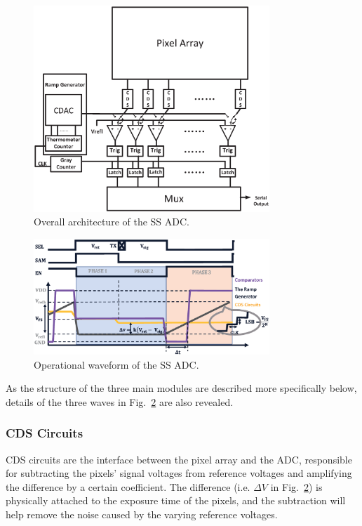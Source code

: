 \begin{figure}[htbp]
	\centerline{\includegraphics[width=3.5in]{./Figures/SSADC.eps}}
	\caption{Overall architecture of the SS ADC.}
	\label{SSADC}
\end{figure} 

\begin{figure}[htbp]
	\centerline{\includegraphics[width=3.5in]{./Figures/SSWAVE.eps}}
	\caption{Operational waveform of the SS ADC.}
	\label{SSWAVE}
\end{figure}

As the structure of the three main modules are described more specifically below, details of the three waves in Fig.~\ref{SSWAVE} are also revealed.

\subsubsection{CDS Circuits}

CDS circuits are the interface between the pixel array and the ADC, responsible for subtracting the pixels’ signal voltages from reference voltages and 
amplifying the difference by a certain coefficient. The difference (i.e. $\Delta{V}$ in Fig.~\ref{SSWAVE}) is physically attached to the exposure time of the pixels, 
and the subtraction will help remove the noise caused by the varying reference voltages. 

